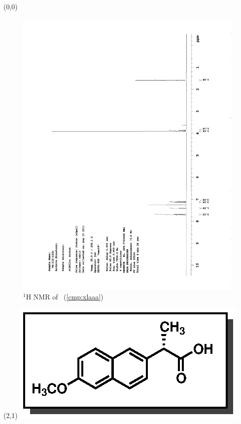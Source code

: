 
\begin{textblock}{20}(0,0)
\begin{figure}[htb]
\caption{$^1$H NMR of \CMPxlaaa\ (\ref{cmp:xlaaa})}
\includegraphics[scale=0.75, trim = 0mm 0mm 0mm 5mm,
clip]{chp_asymmetric/images/nmr/xlaaaH}
\vspace{-100pt}
\end{figure}
\end{textblock}
\begin{textblock}{1}(2,1)
\includegraphics[scale=0.8, angle=90]{chp_asymmetric/images/xlaaa}
\end{textblock}
\clearpage

